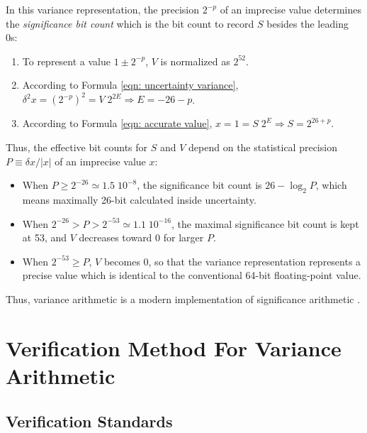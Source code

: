 \documentclass[twoside]{article}
\numberwithin{equation}{section}
\begin{document}
In this variance representation, the precision $2^{-p}$ of an imprecise value determines the \emph{significance bit count} which is the bit count to record $S$ besides the leading 0s:
\begin{enumerate}
\item To represent a value $1 \pm 2^{-p}$, $V$ is normalized as $2^{52}$.

\item According to Formula \eqref{eqn: uncertainty variance}, $\delta^2 x = (2^{-p})^2 = V \; 2^{2E} \Rightarrow E = -26 - p$.

\item According to Formula \eqref{eqn: accurate value}, $ x = 1 = S \; 2^E \Rightarrow S = 2^{26 + p}$.  
\end{enumerate}
Thus, the effective bit counts for $S$ and $V$ depend on the statistical precision $P \equiv \delta x / |x|$ of an imprecise value $x$:
\begin{itemize}
\item When $P \geq 2^{-26} \simeq 1.5\;10^{-8}$, the significance bit count is $26 - \log_{2} P$, which means maximally 26-bit calculated inside uncertainty.

\item When $2^{-26} > P > 2^{-53} \simeq 1.1\;10^{-16}$, the maximal significance bit count is kept at 53, and $V$ decreases toward 0 for larger $P$.

\item When $2^{-53} \geq P$, $V$ becomes 0, so that the variance representation represents a precise value which is identical to the conventional 64-bit floating-point value.
\end{itemize}
Thus, variance arithmetic is a modern implementation of significance arithmetic \cite{Significance_Arithmetic} \cite{Digital_Significance_Arithmetic} \cite{Unnormalized_Arithmetic}.


\clearpage
\section{Verification Method For Variance Arithmetic}
\label{sec: validation}


\subsection{Verification Standards}
\end{document}
